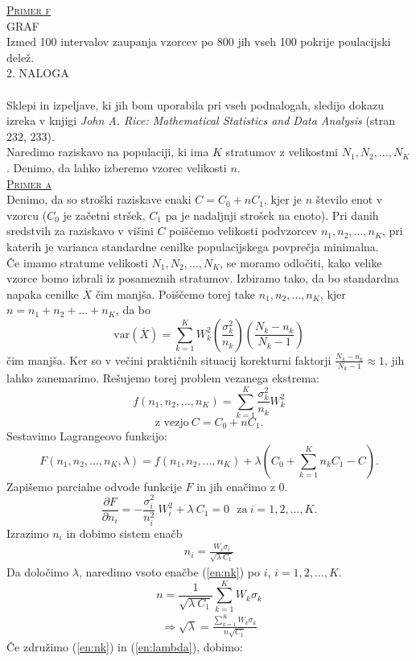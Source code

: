 \documentclass[a4paper,12pt]{article}
\begin{document}

\noindent
\textsc{\underline{Primer f}}
\\
GRAF 
\\
Izmed 100 intervalov zaupanja vzorcev po 800 jih vseh 100 pokrije poulacijski delež.
\\


\noindent
\textsc{\large{2. NALOGA}}
\\
\\
Sklepi in izpeljave, ki jih bom uporabila pri vseh podnalogah, sledijo dokazu izreka v knjigi \textit{John A. Rice: Mathematical Statistics and Data Analysis} (stran $232$, $233$).
\\
Naredimo raziskavo na populaciji, ki ima $K$ stratumov z velikostmi $N_1, N_2, \ldots, N_K$. Denimo, da lahko izberemo vzorec velikosti $n$.
\\

\noindent
\textsc{\underline{Primer a}}
\\
Denimo, da so stroški raziskave enaki $C = C_0 + n C_1$, kjer je $n$ število enot v vzorcu ($C_0$ je začetni stršek, $C_1$ pa je nadaljnji strošek na enoto). Pri danih sredstvih za raziskavo v višini $C$ poiščemo velikosti podvzorcev $n_1, n_2, \ldots, n_K$, pri katerih je varianca standardne cenilke populacijskega povprečja minimalna.
\\
Če imamo stratume velikosti $N_1, N_2, \ldots, N_K$, se moramo odločiti, kako velike vzorce bomo izbrali iz posameznih stratumov. Izbiramo tako, da bo standardna napaka cenilke $\overline{X}$ čim manjša. 
Poiščemo torej take $n_1, n_2, \ldots, n_K$, kjer $n = n_1 + n_2 + \ldots + n_K$, da bo $$ \text{var}(\overline{X}) = \sum_{k = 1}^{K} W_k ^ 2 \left( \frac{ \sigma_k^2}{n_k} \right) \left( \frac{N_k - n_k}{N_k - 1} \right) $$
čim manjša.
Ker so v večini praktičnih situacij korekturni faktorji $\frac{N_k - n_k}{N_k - 1} \approx 1$, jih lahko zanemarimo. Rešujemo torej problem vezanega ekstrema:
$$ f(n_1, n_2, \ldots, n_K) = \sum_{k = 1}^{K} \frac{\sigma_k^2}{n_k} W_k^2 $$
$$ \text{z vezjo} \  C = C_0 + nC_1.$$
Sestavimo Lagrangeovo funkcijo:
$$ F(n_1, n_2, \ldots, n_K, \lambda) = f(n_1, n_2, \ldots, n_K) + \lambda (C_0 + \sum_{k = 1}^{K} n_k C_1 - C). $$
Zapišemo parcialne odvode funkcije $F$ in jih enačimo z $0$.
$$ \frac{ \partial F}{\partial n_i} = - \frac{ \sigma_i^2}{n_i^2} \  W_i^2 + \lambda \ C_1 = 0 \ \ \ \text{za} \ i = 1, 2, \ldots, K. $$
Izrazimo $n_i$ in dobimo sistem enačb
\begin{align}\label{en:nk}
n_i = \frac{W_i \sigma_i}{ \sqrt{ \lambda \ C_1}}
\end{align}
Da določimo $\lambda$, naredimo vsoto enačbe (\ref{en:nk}) po $i$, $i = 1, 2, \ldots, K.$
$$ n = \frac{1}{\sqrt{\lambda \ C_1}} \sum_{k = 1}^{K} W_k \sigma_k $$
\begin{align}\label{en:lambda}
\Rightarrow \sqrt{\lambda} = \frac{\sum_{k = 1}^{K} W_k \sigma_k}{n \sqrt{C_1}}
\end{align}
Če združimo (\ref{en:nk}) in (\ref{en:lambda}), dobimo:
\end{document}
